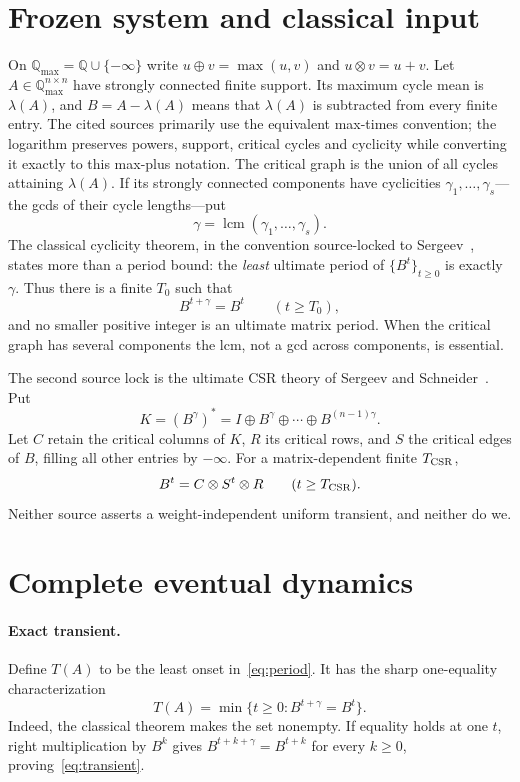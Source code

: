 \documentclass[9pt]{extarticle}
\newcommand{\Rmax}{\mathbb{Q}_{\max}}
\begin{document}
\section{Frozen system and classical input}
On $\Rmax=\mathbb Q\cup\{-\infty\}$ write
$u\oplus v=\max(u,v)$ and $u\otimes v=u+v$.  Let
$A\in\Rmax^{n\times n}$ have strongly connected finite support.  Its maximum
cycle mean is $\lambda(A)$, and $B=A-\lambda(A)$ means that $\lambda(A)$ is
subtracted from every finite entry.  The cited sources primarily use the
equivalent max-times convention; the logarithm preserves powers, support,
critical cycles and cyclicity while converting it exactly to this max-plus
notation.  The critical graph is the union of all
cycles attaining $\lambda(A)$.  If its strongly connected components have
cyclicities $\gamma_1,\ldots,\gamma_s$---the gcds of their cycle lengths---put
\[
 \gamma=\operatorname{lcm}(\gamma_1,\ldots,\gamma_s).
\]
The classical cyclicity theorem, in the convention source-locked to
Sergeev~\cite{Sergeev09}, states more than a period bound: the \emph{least}
ultimate period of $\{B^t\}_{t\ge0}$ is exactly $\gamma$.  Thus there is a
finite $T_0$ such that
\begin{equation}\label{eq:period}
 B^{t+\gamma}=B^t\qquad(t\ge T_0),
\end{equation}
and no smaller positive integer is an ultimate matrix period.  When the
critical graph has several components the lcm, not a gcd across components,
is essential.

The second source lock is the ultimate CSR theory of Sergeev and
Schneider~\cite{SS12}.  Put
\[
 K=(B^\gamma)^*=I\oplus B^\gamma\oplus\cdots\oplus B^{(n-1)\gamma}.
\]
Let $C$ retain the critical columns of $K$, $R$ its critical rows, and $S$ the
critical edges of $B$, filling all other entries by $-\infty$.  For a
matrix-dependent finite $T_{\rm CSR}$,
\begin{equation}\label{eq:csr}
 B^t=C\otimes S^t\otimes R\qquad(t\ge T_{\rm CSR}).
\end{equation}
Neither source asserts a weight-independent uniform transient, and neither do
we.

\section{Complete eventual dynamics}
\paragraph{Exact transient.}
Define $T(A)$ to be the least onset in~\eqref{eq:period}.  It has the sharp
one-equality characterization
\begin{equation}\label{eq:transient}
 T(A)=\min\{t\ge0:B^{t+\gamma}=B^t\}.
\end{equation}
Indeed, the classical theorem makes the set nonempty.  If equality holds at
one $t$, right multiplication by $B^k$ gives
$B^{t+k+\gamma}=B^{t+k}$ for every $k\ge0$, proving~\eqref{eq:transient}.
\end{document}

